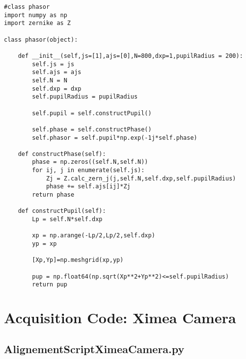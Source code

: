 \begin{lstlisting}
#class phasor
import numpy as np
import zernike as Z

class phasor(object):

    def __init__(self,js=[1],ajs=[0],N=800,dxp=1,pupilRadius = 200):
        self.js = js
        self.ajs = ajs
        self.N = N
        self.dxp = dxp
        self.pupilRadius = pupilRadius
        
        self.pupil = self.constructPupil()
        
        self.phase = self.constructPhase()
        self.phasor = self.pupil*np.exp(-1j*self.phase)

    def constructPhase(self):
        phase = np.zeros((self.N,self.N))
        for ij, j in enumerate(self.js):
            Zj = Z.calc_zern_j(j,self.N,self.dxp,self.pupilRadius)
            phase += self.ajs[ij]*Zj
        return phase
        
    def constructPupil(self):
        Lp = self.N*self.dxp

        xp = np.arange(-Lp/2,Lp/2,self.dxp)
        yp = xp

        [Xp,Yp]=np.meshgrid(xp,yp)
        
        pup = np.float64(np.sqrt(Xp**2+Yp**2)<=self.pupilRadius)
        return pup

\end{lstlisting}

\section{Acquisition Code: Ximea Camera}
\label{app:AcquisitionCodeXimea}

\subsection{AlignementScriptXimeaCamera.py}
\label{subapp:AlignementScriptXimeaCamera}

